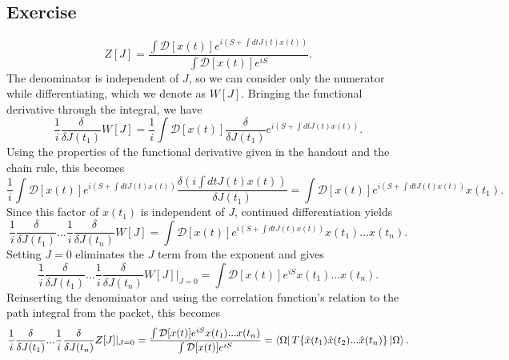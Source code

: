 \subsection{Exercise}
 
\begin{equation}
    Z[J]= \frac{\int \mathcal D [x(t)] e^{i(S+\int dt J(t)x(t))}}{\int \mathcal D [x(t)] e^{iS}}.
\end{equation}
The denominator is independent of $J$, so we can consider only the numerator while differentiating, which we denote as $W[J]$. Bringing the functional derivative through the integral, we have
\begin{equation}
    \frac 1 i \frac{\delta}{\delta J(t_1)} W[J]=\frac 1 i \int \mathcal D[x(t)] \frac{\delta}{\delta J(t_1)} e^{i(S+\int dt J(t)x(t))}.
\end{equation}
Using the properties of the functional derivative given in the handout and the chain rule, this becomes
\begin{equation}
    \frac 1 i \int \mathcal D[x(t)] e^{i(S+\int dt J(t)x(t))}\frac{\delta  (i\int dt J(t)x(t))}{\delta J(t_1)}=\int \mathcal D[x(t)]  e^{i(S+\int dt J(t)x(t))}x(t_1).
\end{equation}
Since this factor of $x(t_1)$ is independent of $J$, continued differentiation yields
\begin{equation}
    \frac 1 i \frac{\delta}{\delta J(t_1)} ...\frac 1 i \frac{\delta}{\delta J(t_n)}W[J]=\int \mathcal D[x(t)] e^{i(S+\int dt J(t)x(t))}x(t_1)...x(t_n).
\end{equation}
Setting $J=0$ eliminates the $J$ term from the exponent and gives
\begin{equation}
    \frac 1 i \frac{\delta}{\delta J(t_1)} ...\frac 1 i \frac{\delta}{\delta J(t_n)}W[J]|_{J=0}=\int \mathcal D[x(t)] e^{iS}x(t_1)...x(t_n).
\end{equation}
Reinserting the denominator and using the correlation function's relation to the path integral from the packet, this becomes
\begin{equation}
    \frac 1 i \frac{\delta}{\delta J(t_1)} ...\frac 1 i \frac{\delta}{\delta J(t_n)}Z[J]|_{J=0}=\frac{\int \mathcal D[x(t)] e^{iS}x(t_1)...x(t_n)}{\int \mathcal D [x(t)] e^{iS}}=\bra{\Omega}T\{\hat x(t_1) \hat x(t_2)...\hat x(t_n)\}\ket{\Omega}.
\end{equation}


